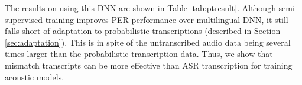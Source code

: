 The results on using this DNN are shown in Table \ref{tab:ptresult}. Although
semi-supervised training improves PER performance over multilingual DNN, it
still falls short of adaptation to probabilistic transcriptions (described in
Section \ref{sec:adaptation}). This is in spite of the untranscribed audio data
being several times larger than the probabilistic transcription data. Thus, we
show that mismatch transcripts can be more effective than ASR transcription for
training acoustic models.
